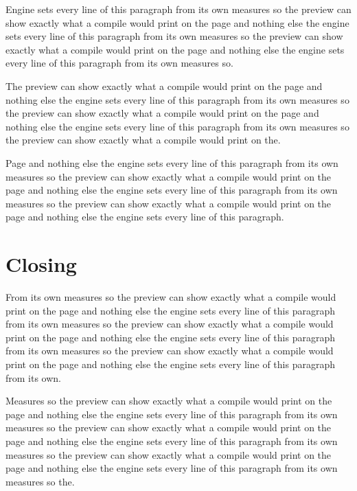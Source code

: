 \documentclass[twoside]{article}
\begin{document}
Engine sets every line of this paragraph from its own measures so the preview can show exactly what a compile would print on the page and nothing else the engine sets every line of this paragraph from its own measures so the preview can show exactly what a compile would print on the page and nothing else the engine sets every line of this paragraph from its own measures so.

The preview can show exactly what a compile would print on the page and nothing else the engine sets every line of this paragraph from its own measures so the preview can show exactly what a compile would print on the page and nothing else the engine sets every line of this paragraph from its own measures so the preview can show exactly what a compile would print on the.

Page and nothing else the engine sets every line of this paragraph from its own measures so the preview can show exactly what a compile would print on the page and nothing else the engine sets every line of this paragraph from its own measures so the preview can show exactly what a compile would print on the page and nothing else the engine sets every line of this paragraph.

\section{Closing}

From its own measures so the preview can show exactly what a compile would print on the page and nothing else the engine sets every line of this paragraph from its own measures so the preview can show exactly what a compile would print on the page and nothing else the engine sets every line of this paragraph from its own measures so the preview can show exactly what a compile would print on the page and nothing else the engine sets every line of this paragraph from its own.

Measures so the preview can show exactly what a compile would print on the page and nothing else the engine sets every line of this paragraph from its own measures so the preview can show exactly what a compile would print on the page and nothing else the engine sets every line of this paragraph from its own measures so the preview can show exactly what a compile would print on the page and nothing else the engine sets every line of this paragraph from its own measures so the.
\end{document}
